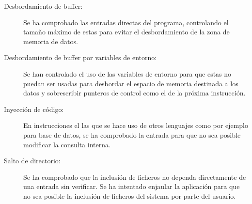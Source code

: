 \begin{description}
\item[Desbordamiento de buffer:] Se ha comprobado las entradas directas del programa, controlando el tamaño máximo de estas para evitar el desbordamiento de la zona de memoria de datos.
\item[Desbordamiento de buffer por variables de entorno:] Se han controlado el uso de las variables de entorno para que estas no puedan ser usadas para desbordar el espacio de memoria 
destinada a los datos y sobrescribir punteros de control como el de la próxima instrucción.
\item[Inyección de código:] En instrucciones el las que se hace uso de otros lenguajes como por ejemplo para base de datos, se ha comprobado la entrada para que no sea posible modificar la consulta interna.
\item[Salto de directorio:] Se ha comprobado que la inclusión de ficheros no dependa directamente de una entrada sin verificar. Se ha intentado enjaular la aplicación para que no sea posible la 
inclusión de ficheros del sistema por parte del usuario. 
\end{description}


